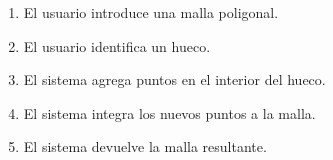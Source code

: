 		\CUNormal
		\begin{enumerate}
			\item El usuario introduce una malla poligonal.
			\item El usuario identifica un hueco. 
			\item El sistema agrega puntos en el interior del hueco.
			\item El sistema integra los nuevos puntos a la malla.
			\item El sistema devuelve la malla resultante.
		\end{enumerate}

